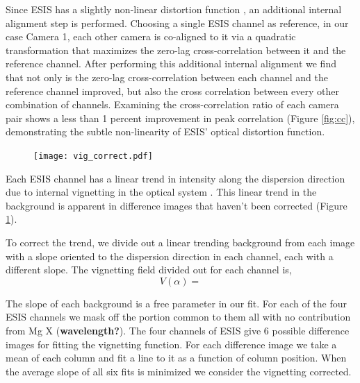         Since ESIS has a slightly non-linear distortion function \citep{ESIS}, an additional internal alignment step is performed.
        Choosing a single ESIS channel as reference, in our case Camera 1, each other camera is co-aligned to it via a quadratic transformation that maximizes the zero-lag cross-correlation between it and the reference channel.
        After performing this additional internal alignment we find that not only is the zero-lag cross-correlation between each channel and the reference channel improved, but also the cross correlation between every other combination of channels.
        Examining the cross-correlation ratio of each camera pair shows a less than 1 percent improvement in peak correlation (Figure \ref{fig:cc}), demonstrating the subtle non-linearity of ESIS' optical distortion function.
        
        \begin{figure}
        	\centering
        	\texttt{[image: vig\_correct.pdf]}
        	\caption{}
        	\label{fig:vig_correct}
        \end{figure}
        	
        Each ESIS channel has a linear trend in intensity along the dispersion direction due to internal vignetting in the optical system \citep{ESIS}.
        This linear trend in the background is apparent in difference images that haven't been corrected (Figure \ref{fig:vig_correct}).
        
        To correct the trend, we divide out a linear trending background from each image with a slope oriented to the dispersion direction in each channel, each with a different slope.
        The vignetting field divided out for each channel is,
            \begin{equation}
                \label{eqn:vignet}
                V(\alpha) = 
            \end{equation}
        
        The slope of each background is a free parameter in our fit.
        For each of the four ESIS channels we mask off the portion common to them all with no contribution from Mg X (\textbf{wavelength?}).
        The four channels of ESIS give 6 possible difference images for fitting the vignetting function. 
        For each difference image we take a mean of each column and fit a line to it as a function of column position.
        When the average slope of all six fits is minimized we consider the vignetting corrected. 
        

